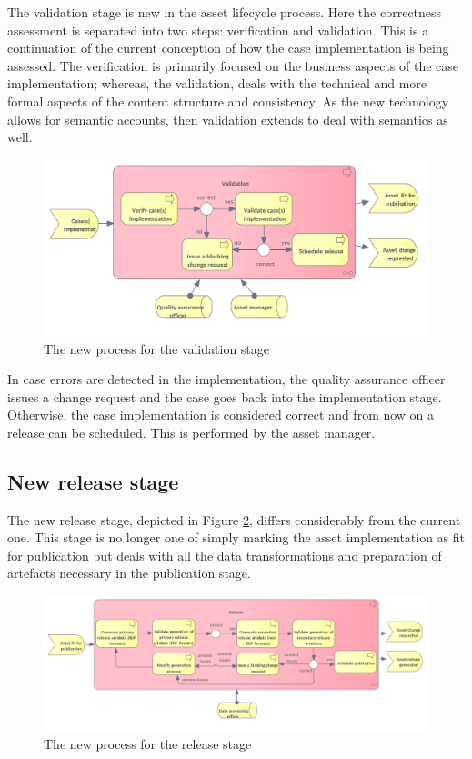 	The validation stage is new in the asset lifecycle process. Here the correctness assessment is separated into two steps: verification and validation. This is a continuation of the current conception of how the case implementation is being assessed. The verification is primarily focused on the business aspects of the case implementation; whereas, the validation, deals with the technical and more formal aspects of the content structure and consistency. As the new technology allows for semantic accounts, then validation extends to deal with semantics as well. 	 

	\begin{figure}[h]
		\centering
		\includegraphics[width=.892\textwidth]{images/business/new/Validation.png}
		\caption{The new process for the validation stage}
		\label{fig:validation-new}
	\end{figure}

	In case errors are detected in the implementation, the quality assurance officer issues a  change request and the case goes back into the implementation stage. Otherwise, the case implementation is considered correct and from now on a release can be scheduled. This is performed by the asset manager. 
		
	\subsection{New release stage}
	\label{sec:release-new}
	
	The new release stage, depicted in Figure \ref{fig:release-new}, differs considerably from the current one. This stage is no longer one of simply marking the asset implementation as fit for publication but deals with all the data transformations and preparation of artefacts necessary in the publication stage.
	
	\begin{figure}[h]
		\centering
		\includegraphics[width=1.05\textwidth]{images/business/new/Release.png}
		\caption{The new process for the release stage}
		\label{fig:release-new}
	\end{figure}

